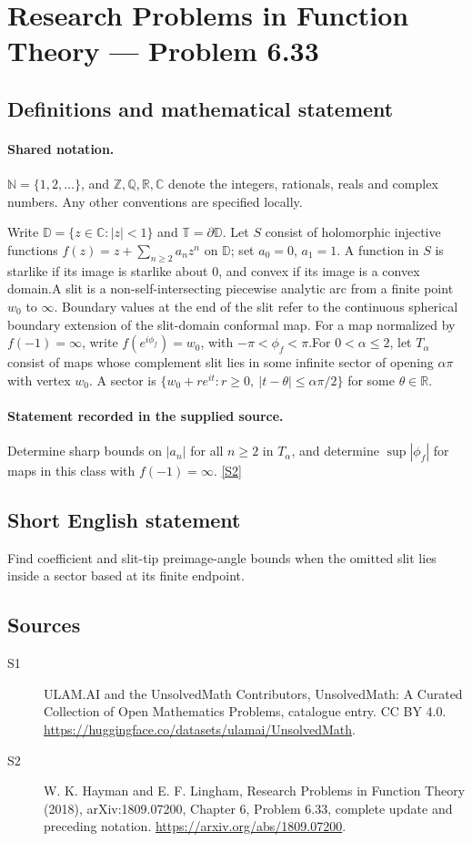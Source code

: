 \documentclass[11pt]{article}
\newcommand{\sref}[2]{\hyperlink{source:#1:#2}{[S#2]}}
\begin{document}
\section{Research Problems in Function Theory — Problem 6.33}\label{statement}

\subsection{Definitions and mathematical statement}

\paragraph{Shared notation.}$\mathbb N=\{1,2,\ldots\}$, and $\mathbb Z,\mathbb Q,\mathbb R,\mathbb C$ denote the integers, rationals, reals and complex numbers. Any other conventions are specified locally.


Write $\mathbb D=\{z\in\mathbb C:|z|<1\}$ and $\mathbb T=\partial\mathbb D$. Let $S$ consist of holomorphic injective functions $f(z)=z+\sum_{n\ge2}a_nz^n$ on $\mathbb D$; set $a_0=0$, $a_1=1$. A function in $S$ is starlike if its image is starlike about $0$, and convex if its image is a convex domain.A slit is a non-self-intersecting piecewise analytic arc from a finite point $w_0$ to $\infty$. Boundary values at the end of the slit refer to the continuous spherical boundary extension of the slit-domain conformal map. For a map normalized by $f(-1)=\infty$, write $f(e^{i\phi_f})=w_0$, with $-\pi<\phi_f<\pi$.For $0<\alpha\le2$, let $T_\alpha$ consist of maps whose complement slit lies in some infinite sector of opening $\alpha\pi$ with vertex $w_0$. A sector is $\{w_0+re^{it}:r\ge0,\ |t-\theta|\le\alpha\pi/2\}$ for some $\theta\in\mathbb R$.
\paragraph{Statement recorded in the supplied source.}
Determine sharp bounds on $|a_n|$ for all $n\ge2$ in $T_\alpha$, and determine $\sup|\phi_f|$ for maps in this class with $f(-1)=\infty$. \sref{statement}{2}
\subsection{Short English statement}
Find coefficient and slit-tip preimage-angle bounds when the omitted slit lies inside a sector based at its finite endpoint.
\subsection{Sources}
\begin{description}
\item[\hypertarget{source:statement:1}{S1}] ULAM.AI and the UnsolvedMath Contributors, UnsolvedMath: A Curated Collection of Open Mathematics Problems, catalogue entry. CC BY 4.0. \url{https://huggingface.co/datasets/ulamai/UnsolvedMath}.
\item[\hypertarget{source:statement:2}{S2}] W. K. Hayman and E. F. Lingham, Research Problems in Function Theory (2018), arXiv:1809.07200, Chapter 6, Problem 6.33, complete update and preceding notation. \url{https://arxiv.org/abs/1809.07200}.
\end{description}
\label{end:statement}
\end{document}
